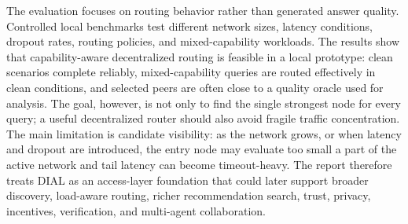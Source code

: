 The evaluation focuses on routing behavior rather than generated answer
quality. Controlled local benchmarks test different network sizes, latency
conditions, dropout rates, routing policies, and mixed-capability workloads.
The results show that capability-aware decentralized routing is feasible in a
local prototype: clean scenarios complete reliably, mixed-capability queries
are routed effectively in clean conditions, and selected peers are often close
to a quality oracle used for analysis. The goal, however, is not only to find
the single strongest node for every query; a useful decentralized router should
also avoid fragile traffic concentration. The main limitation is candidate
visibility: as the
network grows, or when latency and dropout are introduced, the entry node may
evaluate too small a part of the active network and tail latency can become
timeout-heavy. The report therefore treats DIAL as an access-layer foundation
that could later support broader discovery, load-aware routing, richer
recommendation search, trust, privacy, incentives, verification, and
multi-agent collaboration.
